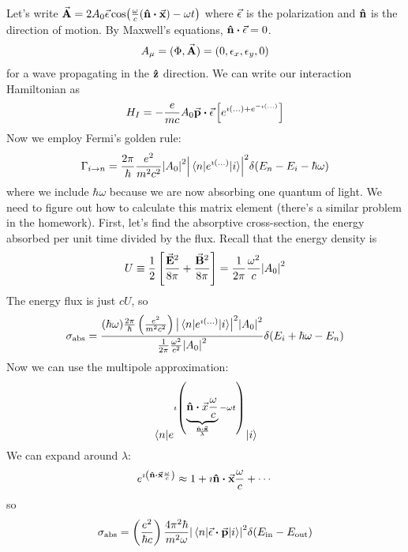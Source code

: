 \documentclass[a4paper,twoside,master.tex]{subfiles}
\begin{document}
Let's write $ \va{A} = 2 A_0 \va{\epsilon} \cos(\frac{\omega}{c} (\vu{n} \vdot \va{x}) - \omega t) $ where $ \va{\epsilon} $ is the polarization and $ \vu{n} $ is the direction of motion. By Maxwell's equations, $ \vu{n} \vdot \va{\epsilon} = 0 $.
\begin{align}
    A_{\mu} = (\Phi, \va{A}) = (0, \epsilon_x, \epsilon_y, 0)
\end{align}
for a wave propagating in the $ \vu{z} $ direction. We can write our interaction Hamiltonian as
\begin{equation}
    H_I = - \frac{e}{mc} A_0 \va{p} \vdot \va{\epsilon} \left[ e^{\imath (\ldots) + e^{- \imath (\ldots)}} \right]
\end{equation}
Now we employ Fermi's golden rule:
\begin{equation}
    \Gamma_{i \to n} = \frac{2 \pi}{\hbar} \frac{e^2}{m^2 c^2} \abs{A_0}^2 \abs{\mel{n}{e^{\imath (\ldots)}}{i}}^2 \delta(E_n - E_i - \hbar \omega)
\end{equation}
where we include $ \hbar \omega $ because we are now absorbing one quantum of light. We need to figure out how to calculate this matrix element (there's a similar problem in the homework). First, let's find the absorptive cross-section, the energy absorbed per unit time divided by the flux. Recall that the energy density is
\begin{equation}
    U \equiv \frac{1}{2} \left[ \frac{\va{E}^2}{8 \pi} + \frac{\va{B}^2}{8 \pi} \right] = \frac{1}{2 \pi} \frac{\omega^2}{c} \abs{A_0}^2
\end{equation}
The energy flux is just $ cU $, so
\begin{equation}
    \sigma_{\text{abs}} = \frac{(\hbar \omega) \frac{2 \pi}{\hbar} \left( \frac{e^2}{m^2 c^2} \right) \abs{\mel{n}{e^{\imath (\ldots)}}{i}}^2 \abs{A_0}^2}{\frac{1}{2 \pi} \frac{\omega^2}{c^2} \abs{A_0}^2} \delta(E_i + \hbar \omega - E_n)
\end{equation}
Now we can use the multipole approximation:
\begin{equation}
    \mel{n}{e^{\imath \left( \underbrace{\vu{n} \vdot \vec{x} \frac{\omega}{c}}_{\frac{\vu{n} \vdot \va{x}}{\lambda}} - \omega t \right)}}{i}
\end{equation}
We can expand around $ \lambda $:
\begin{equation}
    e^{\imath \left( \vu{n} \vdot \va{x} \frac{\omega}{c} \right)} \approx 1 + \imath \vu{n} \vdot \va{x} \frac{\omega}{c} + \cdots
\end{equation}
so
\begin{equation}
    \sigma_{\text{abs}} = \left( \frac{e^2}{\hbar c} \right) \frac{4 \pi^2 \hbar}{m^2 \omega} \abs{\mel{n}{\va{\epsilon} \vdot \va{p}}{i}}^2 \delta(E_{\text{in}} - E_{\text{out}})
\end{equation}
\end{document}
